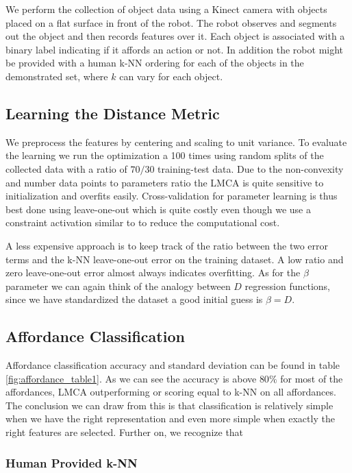 We perform the collection of object data using a Kinect camera with
objects placed on a flat surface in front of the robot. The robot
observes and segments out the object and then records features over it.
Each object is associated with a binary label indicating if it affords
an action or not. In addition the robot might be provided with a human
k-NN ordering for each of the objects in the demonstrated set, where
\(k\) can vary for each object.

\subsection{Learning the Distance
Metric}\label{learning-the-distance-metric}

We preprocess the features by centering and scaling to unit variance. To
evaluate the learning we run the optimization a 100 times using random
splits of the collected data with a ratio of \(70/30\) training-test
data. Due to the non-convexity and number data points to parameters
ratio the LMCA is quite sensitive to initialization and overfits easily.
Cross-validation for parameter learning is thus best done using
leave-one-out which is quite costly even though we use a constraint
activation similar to \cite{Weinberger:2009to} to reduce the
computational cost.

A less expensive approach is to keep track of the ratio between the two
error terms and the k-NN leave-one-out error on the training dataset. A
low ratio and zero leave-one-out error almost always indicates
overfitting. As for the \(\beta\) parameter we can again think of the
analogy between \(D\) regression functions, since we have standardized
the dataset a good initial guess is \(\beta=D\).

\subsection{Affordance Classification}\label{affordance-classification}

Affordance classification accuracy and standard deviation can be found
in table \ref{fig:affordance_table1}. As we can see the accuracy is
above \(80\%\) for most of the affordances, LMCA outperforming or
scoring equal to k-NN on all affordances. The conclusion we can draw
from this is that classification is relatively simple when we have the
right representation and even more simple when exactly the right
features are selected. Further on, we recognize that

\subsubsection{Human Provided k-NN}\label{human-provided-k-nn}

